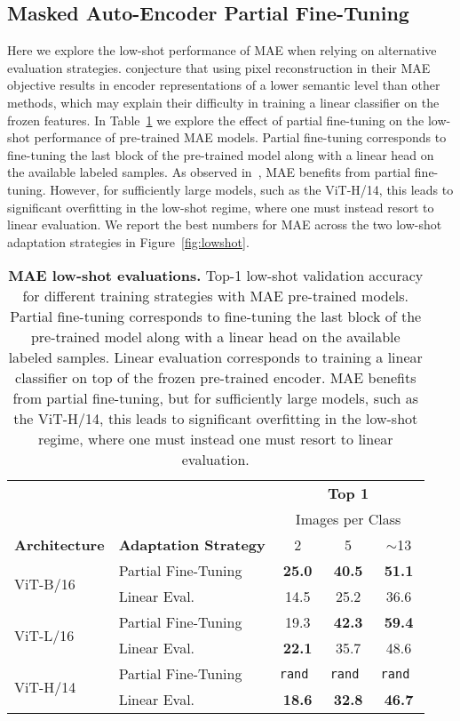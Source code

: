\documentclass{article}
\begin{document}
\subsection{Masked Auto-Encoder Partial Fine-Tuning}
Here we explore the low-shot performance of MAE when relying on alternative evaluation strategies.
\citet{he2021masked} conjecture that using pixel reconstruction in their MAE objective results in encoder representations of a lower semantic level than other methods, which may explain their difficulty in training a linear classifier on the frozen features.
In Table~\ref{tb:mae-eval} we explore the effect of partial fine-tuning on the low-shot performance of pre-trained MAE models.
Partial fine-tuning corresponds to fine-tuning the last block of the pre-trained model along with a linear head on the available labeled samples.
As observed in~\citep{he2021masked}, MAE benefits from partial fine-tuning.
However, for sufficiently large models, such as the ViT-H/14, this leads to significant overfitting in the low-shot regime, where one must instead resort to linear evaluation.
We report the best numbers for MAE across the two low-shot adaptation strategies in Figure~\ref{fig:lowshot}.
\begin{table}[h]
    \centering
    \caption{{\bf MAE low-shot evaluations.} Top-1 low-shot validation accuracy for different training strategies with MAE pre-trained models. Partial fine-tuning corresponds to fine-tuning the last block of the pre-trained model along with a linear head on the available labeled samples. Linear evaluation corresponds to training a linear classifier on top of the frozen pre-trained encoder. MAE benefits from partial fine-tuning, but for sufficiently large models, such as the ViT-H/14, this leads to significant overfitting in the low-shot regime, where one must instead one must resort to linear evaluation.}
    \label{tb:mae-eval}
    \begin{tabular}{l l c c c}
        & & \multicolumn{3}{c}{\bf\small Top 1}\\[1.5mm]
        & & \multicolumn{3}{c}{\small Images per Class}\\
        \bf\small Architecture & \bf\small Adaptation Strategy & 2 & 5 & $\sim$13 \\\toprule
        \multirow{2}{*}{ViT-B/16} & Partial Fine-Tuning & \bf\cellcolor{fbApp} 25.0 & \bf\cellcolor{fbApp} 40.5 & \bf\cellcolor{fbApp} 51.1 \\
        & Linear Eval. & 14.5 & 25.2 & 36.6 \\\midrule
        \multirow{2}{*}{ViT-L/16} & Partial Fine-Tuning & 19.3 & \bf\cellcolor{fbApp} 42.3 & \bf\cellcolor{fbApp} 59.4 \\
        & Linear Eval. & \bf\cellcolor{fbApp} 22.1 & 35.7 & 48.6 \\\midrule
        \multirow{2}{*}{ViT-H/14} & Partial Fine-Tuning & \tt rand & \tt rand & \tt rand \\
        & Linear Eval. & \bf\cellcolor{fbApp} 18.6 & \bf\cellcolor{fbApp} 32.8 & \bf\cellcolor{fbApp} 46.7 \\\bottomrule
    \end{tabular}
\end{table}
\end{document}
